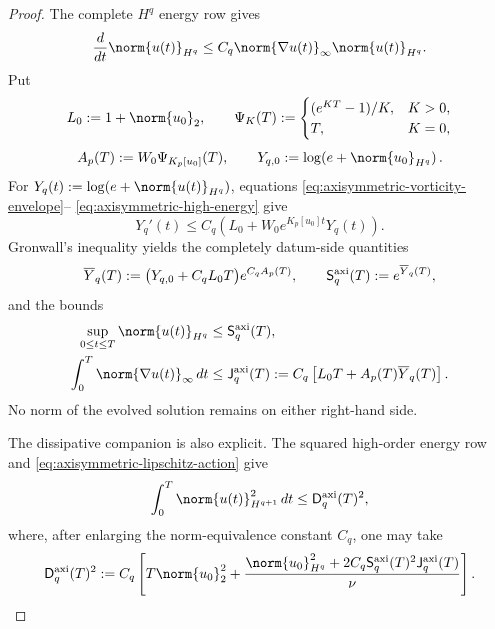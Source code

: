 \begin{proof}
The complete \(H^q\) energy row gives
\begin{equation}
 \frac d{dt}\norm{u(t)}_{H^q}
 \le C_q\norm{\nabla u(t)}_\infty\norm{u(t)}_{H^q}.
 \label{eq:axisymmetric-high-energy}
\end{equation}
Put
\[
 L_0:=1+\norm{u_0}_2,
 \qquad
 \Psi_K(T):=
 \begin{cases}
  (e^{KT}-1)/K,&K>0,\\
  T,&K=0,
 \end{cases}
\]
\begin{equation}
 A_p(T):=W_0\Psi_{K_p[u_0]}(T),
 \qquad
 Y_{q,0}:=\log\!\left(e+\norm{u_0}_{H^q}\right).
 \label{eq:axisymmetric-envelope-data}
\end{equation}
For
\(Y_q(t):=\log(e+\norm{u(t)}_{H^q})\), equations
\eqref{eq:axisymmetric-vorticity-envelope}--
\eqref{eq:axisymmetric-high-energy} give
\[
 Y_q'(t)
 \le C_q\left(L_0+W_0e^{K_p[u_0]t}Y_q(t)\right).
\]
Gronwall's inequality yields the completely datum-side quantities
\begin{equation}
 \overline Y_q(T)
 :=\bigl(Y_{q,0}+C_qL_0T\bigr)e^{C_qA_p(T)},
 \qquad
 \mathsf S_q^{\rm axi}(T):=e^{\overline Y_q(T)},
 \label{eq:axisymmetric-spatial-envelope}
\end{equation}
and the bounds
\begin{align}
 \sup_{0\le t\le T}\norm{u(t)}_{H^q}
 &\le\mathsf S_q^{\rm axi}(T),
 \label{eq:axisymmetric-spatial-envelope-bound}\\
 \int_0^T\norm{\nabla u(t)}_\infty\,dt
 &\le\mathsf J_q^{\rm axi}(T)
 :=C_q\left[L_0T+A_p(T)\overline Y_q(T)\right].
 \label{eq:axisymmetric-lipschitz-action}
\end{align}
No norm of the evolved solution remains on either right-hand side.

The dissipative companion is also explicit.  The squared high-order energy
row and \eqref{eq:axisymmetric-lipschitz-action} give
\begin{equation}
 \int_0^T\norm{u(t)}_{H^{q+1}}^2\,dt
 \le\mathsf D_q^{\rm axi}(T)^2,
 \label{eq:axisymmetric-dissipation-bound}
\end{equation}
where, after enlarging the norm-equivalence constant \(C_q\), one may take
\begin{equation}
 \mathsf D_q^{\rm axi}(T)^2
 :=C_q\left[
 T\norm{u_0}_2^2
 +\frac{\norm{u_0}_{H^q}^2
        +2C_q\mathsf S_q^{\rm axi}(T)^2
          \mathsf J_q^{\rm axi}(T)}{\nu}
 \right].
 \label{eq:axisymmetric-dissipation-envelope}
\end{equation}


\end{proof}
